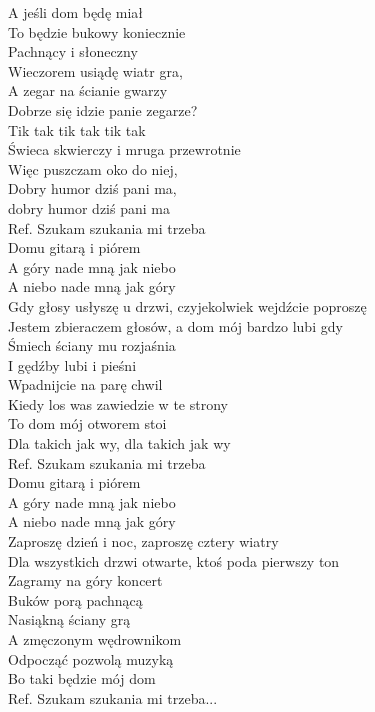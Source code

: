 
A jeśli dom będę miał \tab{}\\
To będzie bukowy koniecznie\tab{}\\
Pachnący i słoneczny \tab{}\\
Wieczorem usiądę wiatr gra, \tab{} \\
A zegar na ścianie gwarzy \tab{}\\
Dobrze się idzie panie zegarze?  \\
Tik tak tik tak tik tak \tab{}\\
\hop
Świeca skwierczy i mruga przewrotnie \\
Więc puszczam oko do niej, \tab{}\\
Dobry humor dziś pani ma, \tab{}\\
dobry humor dziś pani ma \tab{}\\
\hops
Ref. Szukam szukania mi trzeba \\
 Domu gitarą i piórem \tab{}\\
 A góry nade mną jak niebo \\
 A niebo nade mną jak góry \\
\hops
Gdy głosy usłyszę u drzwi, czyjekolwiek wejdźcie poproszę \\
Jestem zbieraczem głosów, a dom mój bardzo lubi gdy \\
Śmiech ściany mu rozjaśnia \\
I gędźby lubi i pieśni \\
Wpadnijcie na parę chwil \\
Kiedy los was zawiedzie w te strony \\
To dom mój otworem stoi \\
Dla takich jak wy, dla takich jak wy \\
\hops
Ref. Szukam szukania mi trzeba\\
 Domu gitarą i piórem \\
 A góry nade mną jak niebo \\
 A niebo nade mną jak góry \\
\hops
Zaproszę dzień i noc, zaproszę cztery wiatry \\
Dla wszystkich drzwi otwarte, ktoś poda pierwszy ton \\
Zagramy na góry koncert \\
Buków porą pachnącą \\
Nasiąkną ściany grą \\
A zmęczonym wędrownikom \\
Odpocząć pozwolą muzyką \\
Bo taki będzie mój dom \\
\hop
Ref. Szukam szukania mi trzeba...
